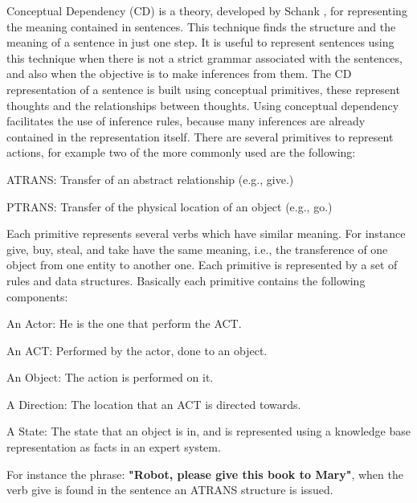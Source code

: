 \documentclass{llncs}
\begin{document}
Conceptual Dependency (CD) is a theory, developed by Schank \cite{Schank}, for representing the meaning contained in sentences. 
This technique finds the structure and the meaning of a sentence in just one step. 
It is useful to represent sentences using this technique when there is not a strict grammar associated with the sentences, and also when the objective is to make inferences from them.
The CD representation of a sentence is built using conceptual primitives, these represent thoughts and the relationships between thoughts. Using conceptual dependency facilitates the use of inference rules, because many inferences are already contained in the representation itself.
There are several primitives to represent actions, for example two of the more commonly used are the following:

\vspace{.01 in}
		ATRANS: Transfer of an abstract relationship (e.g., give.)

\vspace{.01 in}
		PTRANS: Transfer of the physical location of an object (e.g., go.)
\vspace{.01 in}

Each primitive represents several verbs which have similar meaning. For instance give, buy, steal, and take have the same meaning, i.e., the transference of one object from one entity to another one.
Each primitive is represented by a set of rules and data structures. Basically each primitive contains the following components:
\vspace{.01 in}

	An Actor: He is the one that perform the ACT.
\vspace{.01 in}

	An ACT: Performed by the actor, done to an object.
\vspace{.01 in}

	An Object: The action is performed on it.
\vspace{.01 in}

	A Direction: The location that an ACT is directed towards.
\vspace{.01 in}

	A State: The state that an object is in, and is represented using a knowledge base representation as
facts in an expert system. 
\vspace{.01 in}

	For instance the phrase: {\bf "Robot, please give this book to Mary"}, 
when the verb give is found in the sentence an ATRANS structure is issued.
\vspace{.01 in}
\end{document}
